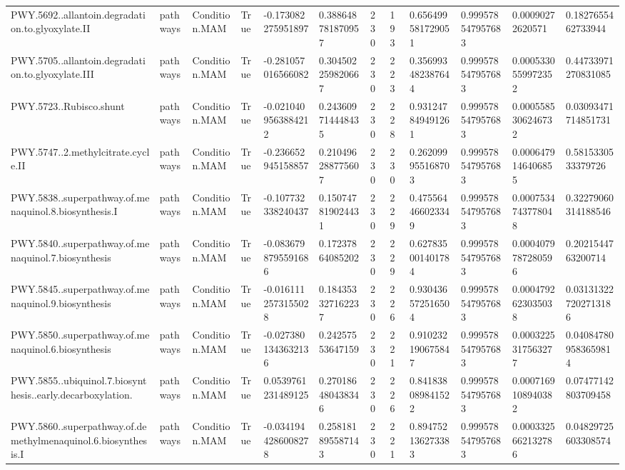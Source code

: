 \begin{longtable}{llllllllllll}
PWY.5692..allantoin.degradation.to.glyoxylate.II & pathways & Condition.MAM & True & -0.173082275951897 & 0.388648781870957 & 230 & 193 & 0.656499581729051 & 0.999578547957683 & 0.00090272620571 & 0.1827655462733944 \\
PWY.5705..allantoin.degradation.to.glyoxylate.III & pathways & Condition.MAM & True & -0.281057016566082 & 0.304502259820667 & 230 & 223 & 0.356993482387644 & 0.999578547957683 & 0.0005330559972352 & 0.44733971270831085 \\
PWY.5723..Rubisco.shunt & pathways & Condition.MAM & True & -0.0210409563884212 & 0.243609714448435 & 230 & 228 & 0.931247849491261 & 0.999578547957683 & 0.0005585306246732 & 0.03093471714851731 \\
PWY.5747..2.methylcitrate.cycle.II & pathways & Condition.MAM & True & -0.236652945158857 & 0.210496288775607 & 230 & 230 & 0.262099955168703 & 0.999578547957683 & 0.0006479146406855 & 0.5815330533379726 \\
PWY.5838..superpathway.of.menaquinol.8.biosynthesis.I & pathways & Condition.MAM & True & -0.107732338240437 & 0.150747819024431 & 230 & 229 & 0.475564466023349 & 0.999578547957683 & 0.0007534743778048 & 0.32279060314188546 \\
PWY.5840..superpathway.of.menaquinol.7.biosynthesis & pathways & Condition.MAM & True & -0.0836798795591686 & 0.17237864085202 & 230 & 229 & 0.627835001401784 & 0.999578547957683 & 0.0004079787280596 & 0.2021544763200714 \\
PWY.5845..superpathway.of.menaquinol.9.biosynthesis & pathways & Condition.MAM & True & -0.0161112573155028 & 0.184353327162237 & 230 & 226 & 0.930436572516504 & 0.999578547957683 & 0.0004792623035038 & 0.031313227202713186 \\
PWY.5850..superpathway.of.menaquinol.6.biosynthesis & pathways & Condition.MAM & True & -0.0273801343632136 & 0.24257553647159 & 230 & 221 & 0.910232190675847 & 0.999578547957683 & 0.0003225317563277 & 0.040847809583659814 \\
PWY.5855..ubiquinol.7.biosynthesis..early.decarboxylation. & pathways & Condition.MAM & True & 0.0539761231489125 & 0.270186480438346 & 230 & 226 & 0.841838089841522 & 0.999578547957683 & 0.0007169108940382 & 0.07477142803709458 \\
PWY.5860..superpathway.of.demethylmenaquinol.6.biosynthesis.I & pathways & Condition.MAM & True & -0.0341944286008278 & 0.258181895587143 & 230 & 221 & 0.894752136273383 & 0.999578547957683 & 0.0003325662132786 & 0.04829725603308574 \\

\end{longtable}
